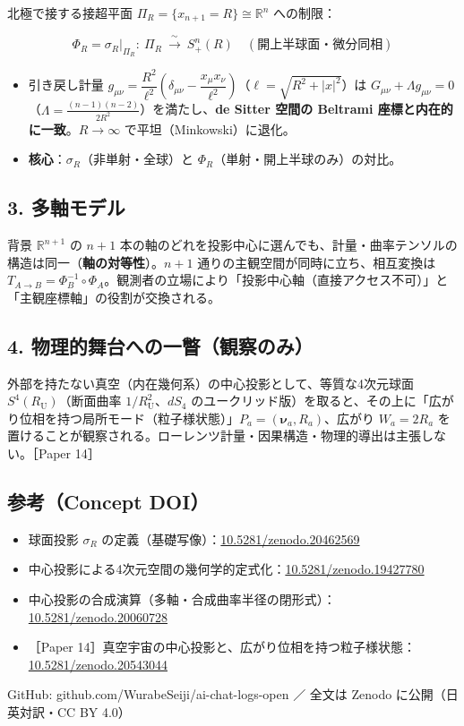 \documentclass[
  9pt,
]{ltjsarticle}
\providecommand{\tightlist}{%
  \setlength{\itemsep}{0pt}\setlength{\parskip}{0pt}}
\begin{document}
北極で接する接超平面 \(\Pi_R=\{x_{n+1}=R\}\cong\mathbb{R}^n\) への制限：

\[\Phi_R=\sigma_R\big|_{\Pi_R}:\ \Pi_R\ \xrightarrow{\ \sim\ }\ S^n_+(R)\quad(\text{開上半球面・微分同相})\]

\begin{itemize}
\tightlist
\item
  引き戻し計量
  \(g_{\mu\nu}=\dfrac{R^2}{\ell^2}\!\left(\delta_{\mu\nu}-\dfrac{x_\mu x_\nu}{\ell^2}\right)\)（\(\ell=\sqrt{R^2+|x|^2}\)）は
  \(G_{\mu\nu}+\Lambda g_{\mu\nu}=0\)（\(\Lambda=\tfrac{(n-1)(n-2)}{2R^2}\)）を満たし、\textbf{de
  Sitter 空間の Beltrami 座標と内在的に一致}。\(R\to\infty\)
  で平坦（Minkowski）に退化。
\item
  \textbf{核心}：\(\sigma_R\)（非単射・全球）と
  \(\Phi_R\)（単射・開上半球のみ）の対比。
\end{itemize}

\subsection{3. 多軸モデル}\label{ux591aux8ef8ux30e2ux30c7ux30eb}

背景 \(\mathbb{R}^{n+1}\) の \(n+1\)
本の軸のどれを投影中心に選んでも、計量・曲率テンソルの構造は同一（\textbf{軸の対等性}）。\(n+1\)
通りの主観空間が同時に立ち、相互変換は
\(T_{A\to B}=\Phi_B^{-1}\circ\Phi_A\)。観測者の立場により「投影中心軸（直接アクセス不可）」と「主観座標軸」の役割が交換される。

\subsection{4.
物理的舞台への一瞥（観察のみ）}\label{ux7269ux7406ux7684ux821eux53f0ux3078ux306eux4e00ux77a5ux89b3ux5bdfux306eux307f}

外部を持たない真空（内在幾何系）の中心投影として、等質な4次元球面
\(S^4(R_{\mathrm U})\)（断面曲率 \(1/R_{\mathrm U}^2\)、\(dS_4\)
のユークリッド版）を取ると、その上に「広がり位相を持つ局所モード（粒子様状態）」\(P_a=(\boldsymbol{\nu}_a,R_a)\)、広がり
\(W_a=2R_a\)
を置けることが観察される。ローレンツ計量・因果構造・物理的導出は主張しない。［Paper
14］

\subsection{参考（Concept DOI）}\label{ux53c2ux8003concept-doi}

\begin{itemize}
\tightlist
\item
  球面投影 \(\sigma_R\)
  の定義（基礎写像）：\href{https://doi.org/10.5281/zenodo.20462569}{10.5281/zenodo.20462569}
\item
  中心投影による4次元空間の幾何学的定式化：\href{https://doi.org/10.5281/zenodo.19427780}{10.5281/zenodo.19427780}
\item
  中心投影の合成演算（多軸・合成曲率半径の閉形式）：\href{https://doi.org/10.5281/zenodo.20060728}{10.5281/zenodo.20060728}
\item
  ［Paper
  14］真空宇宙の中心投影と、広がり位相を持つ粒子様状態：\href{https://doi.org/10.5281/zenodo.20543044}{10.5281/zenodo.20543044}
\end{itemize}

GitHub: github.com/WurabeSeiji/ai-chat-logs-open ／ 全文は Zenodo
に公開（日英対訳・CC BY 4.0）
\end{document}

